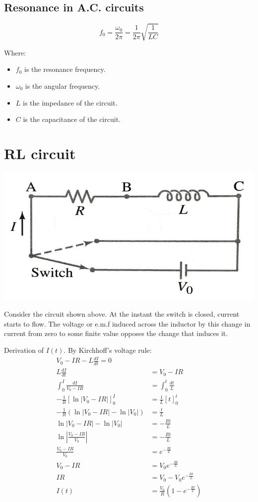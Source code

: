 \documentclass[11pt]{article}
\begin{document}
\subsection{Resonance in A.C. circuits}
\label{sec:org5628a49}
\[f_0 = \frac{\omega_0}{2 \pi} = \frac{1}{2 \pi} \sqrt{\frac{1}{LC}}\]

Where:
\begin{itemize}
\item \(f_0\) is the resonance frequency.
\item \(\omega_0\) is the angular frequency.
\item \(L\) is the impedance of the circuit.
\item \(C\) is the capacitance of the circuit.
\end{itemize}
\section{RL circuit}
\label{sec:org8392a5c}
\begin{center}
\includegraphics[width=.9\linewidth]{./images/rl-circuit.png}
\end{center}

Consider the circuit shown above. At the instant the switch is closed, current starts to flow. The voltage or e.m.f induced across the inductor by this change in current from zero to some finite value opposes the change that induces it.


Derivation of \(I(t)\). By Kirchhoff's voltage rule:
\begin{align*}
V_0 - IR - L \frac{dI}{dt} = 0 \\
L \frac{dI}{dt} &= V_0 - IR \\
\int_0^I \frac{dI}{V_0 - IR} &= \int_0^t \frac{dt}{L} \\
-\frac{1}{R} \left[\ln |V_0 - IR| \right]_0^I &= \frac{1}{L}[t]_0^t \\
-\frac{1}{R} \left(\ln |V_0 - IR| - \ln |V_0| \right) &= \frac{t}{L} \\
\ln |V_0 - IR| - \ln |V_0| &= -\frac{Rt}{L} \\
\ln \left| \frac{V_0 - IR}{V_0} \right| &= -\frac{Rt}{L} \\
\frac{V_0 - IR}{V_0} &= e^{-\frac{Rt}{L}} \\
V_0 - IR &= V_0 e^{-\frac{Rt}{L}} \\
IR &= V_0 - V_0 e^{- \frac{Rt}{L}} \\
I(t) &= \frac{V_0}{R} \left(1 - e^{- \frac{Rt}{L}} \right)
\end{align*}
\end{document}
